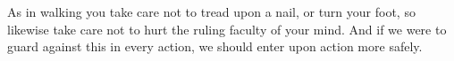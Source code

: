 As in walking you take care not to tread upon a nail, or turn your foot,
so likewise take care not to hurt the ruling faculty of your mind. And if
we were to guard against this in every action, we should enter upon
action more safely.
